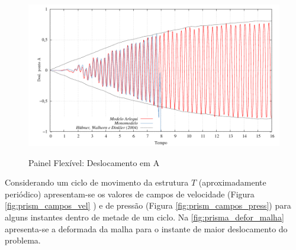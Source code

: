 \begin{figure}[!htbp]
	\caption{Painel Flexível: Deslocamento em A}
	\centering 
	\includegraphics[scale=1.0,trim=0cm 0cm 0cm 0cm, clip=true]{Imagens/Cap7/prisma_deslA.pdf}	
	\label{fig:prisma_deslA}
\end{figure}

Considerando um ciclo de movimento da estrutura $T$ (aproximadamente periódico) apresentam-se os valores de campos de velocidade (Figura \ref{fig:prism_campos_vel} ) e de pressão (Figura \ref{fig:prism_campos_press}) para alguns instantes dentro de metade de um ciclo. Na \autoref{fig:prisma_defor_malha} apresenta-se a deformada da malha para o instante de maior deslocamento do problema.

